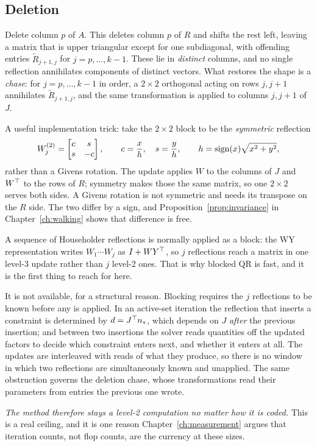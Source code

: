 \subsection{Deletion}

Delete column $p$ of $A$. This deletes column $p$ of $R$ and shifts the rest left,
leaving a matrix that is upper triangular except for one subdiagonal, with
offending entries $\tilde R_{j+1,j}$ for $j = p,\dots,k-1$. These lie in
\emph{distinct} columns, and no single reflection annihilates components of
distinct vectors. What restores the shape is a \emph{chase}: for $j = p,\dots,k-1$
in order, a $2\times2$ orthogonal acting on rows $j,j+1$ annihilates
$\tilde R_{j+1,j}$, and the same transformation is applied to columns $j, j+1$
of $J$.

A useful implementation trick: take the $2\times 2$ block to be the \emph{symmetric}
reflection
\begin{equation}
  W_j^{(2)} = \begin{bmatrix} c & s \\ s & -c \end{bmatrix},
  \qquad c = \frac{x}{h},\quad s = \frac{y}{h},
  \qquad h = \operatorname{sign}(x)\sqrt{x^2+y^2},
  \label{eq:refl2}
\end{equation}
rather than a Givens rotation. The update applies $W$ to the columns of $J$ and
$W^{\top}$ to the rows of $R$; symmetry makes those the same matrix, so one $2\times2$
serves both sides. A Givens rotation is not symmetric and needs its transpose on
the $R$ side. The two differ by a sign, and Proposition~\ref{prop:invariance} in
Chapter~\ref{ch:walking} shows that difference is free.

\begin{remark}
\label{rem:wy}
A sequence of Householder reflections is normally applied as a block: the WY
representation \cite{bischof1987,schreiber1989} writes $W_1\cdots W_j$ as
$I + WY^{\top}$, so $j$ reflections reach a matrix in one level-3 update rather than
$j$ level-2 ones. That is why blocked QR is fast, and it is the first thing to
reach for here.

It is not available, for a structural reason. Blocking requires the $j$
reflections to be known before any is applied. In an active-set iteration the
reflection that inserts a constraint is determined by $d = J^{\top} n_*$, which depends
on $J$ \emph{after} the previous insertion; and between two insertions the solver
reads quantities off the updated factors to decide which constraint enters next,
and whether it enters at all. The updates are interleaved with reads of what they
produce, so there is no window in which two reflections are simultaneously known
and unapplied. The same obstruction governs the deletion chase, whose
transformations read their parameters from entries the previous one wrote.

\emph{The method therefore stays a level-2 computation no matter how it is coded.}
This is a real ceiling, and it is one reason Chapter~\ref{ch:measurement} argues
that iteration counts, not flop counts, are the currency at these sizes.
\end{remark}

